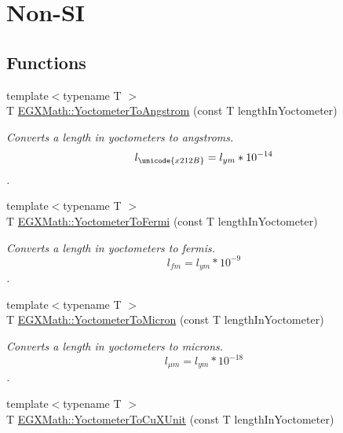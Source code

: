 \hypertarget{group___e_g_x_math-_conversions-_length_conversions-_s_i-_yoctometer-_non-_s_i}{}\section{Non-\/\+SI}
\label{group___e_g_x_math-_conversions-_length_conversions-_s_i-_yoctometer-_non-_s_i}
\subsection*{Functions}
\begin{DoxyCompactItemize}
\item 
{\footnotesize template$<$typename T $>$ }\\T \mbox{\hyperlink{group___e_g_x_math-_conversions-_length_conversions-_s_i-_yoctometer-_non-_s_i_ga1189896c419175e90e23cea9d8f6b52a}{E\+G\+X\+Math\+::\+Yoctometer\+To\+Angstrom}} (const T length\+In\+Yoctometer)
\begin{DoxyCompactList}\small\item\em Converts a length in yoctometers to angstroms. \[ l_{\unicode{x212B}}=l_{ym} * 10^{-14} \]. \end{DoxyCompactList}\item 
{\footnotesize template$<$typename T $>$ }\\T \mbox{\hyperlink{group___e_g_x_math-_conversions-_length_conversions-_s_i-_yoctometer-_non-_s_i_gadcf3b93b00bf0d160f27d3a1a4b8ed9f}{E\+G\+X\+Math\+::\+Yoctometer\+To\+Fermi}} (const T length\+In\+Yoctometer)
\begin{DoxyCompactList}\small\item\em Converts a length in yoctometers to fermis. \[ l_{fm}=l_{ym} * 10^{-9} \]. \end{DoxyCompactList}\item 
{\footnotesize template$<$typename T $>$ }\\T \mbox{\hyperlink{group___e_g_x_math-_conversions-_length_conversions-_s_i-_yoctometer-_non-_s_i_ga4863fe4d5268ab023ec32d0281171b55}{E\+G\+X\+Math\+::\+Yoctometer\+To\+Micron}} (const T length\+In\+Yoctometer)
\begin{DoxyCompactList}\small\item\em Converts a length in yoctometers to microns. \[ l_{\mu m}=l_{ym} * 10^{-18} \]. \end{DoxyCompactList}\item 
{\footnotesize template$<$typename T $>$ }\\T \mbox{\hyperlink{group___e_g_x_math-_conversions-_length_conversions-_s_i-_yoctometer-_non-_s_i_ga0266faf325ea86fef13391fb6e792ff8}{E\+G\+X\+Math\+::\+Yoctometer\+To\+Cu\+X\+Unit}} (const T length\+In\+Yoctometer)

\end{DoxyCompactItemize}
